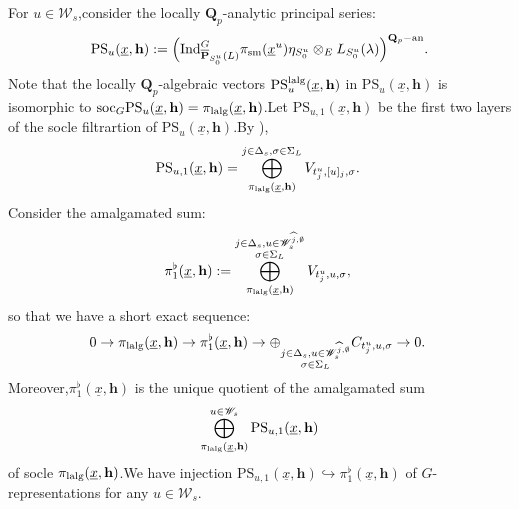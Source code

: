 \documentclass[10pt]{article}
\newcommand{\ind}{{\rm Ind}}
\newcommand{\ana}{{\rm an}}
\newcommand{\op}{{\overline{{\mathbf{P}}}}}
\newcommand{\soc}{{\rm soc}}
\newcommand{\sm}{{\rm sm}}
\newcommand{\lalg}{{\rm lalg}}
\newcommand{\bQ}{{\mathbf{Q}}}
\newcommand{\bh}{{\mathbf{h}}}
\newcommand{\sW}{\mathscr W}
\begin{document}
For $u\in\sW_s$,\;consider the locally  $\bQ_p$-analytic  principal series:
\begin{equation}\label{locaparabolicind}
	\begin{aligned}
	&\mathrm{PS}_{u}(\underline{x},\bh):=\Big(\ind^G_{\op_{S^u_0}(L)}\pi_{\sm}(\underline{x}^u)\eta_{S^u_0}\otimes_E L_{S_0^u}(\lambda)\Big)^{\bQ_p-\ana}.\\
	\end{aligned}
\end{equation}
Note that the locally $\bQ_p$-algebraic vectors  $\mathrm{PS}^{\lalg}_{u}(\underline{x},\bh)$ in $\mathrm{PS}_{u}(\underline{x},\bh)$ is isomorphic to  $\soc_G\mathrm{PS}_{u}(\underline{x},\bh)=\pi_{\lalg}(\underline{x},\bh)$.\;Let $\mathrm{PS}_{u,1}(\underline{x},\bh)$ be the first two layers of the socle filtrartion of $\mathrm{PS}_{u}(\underline{x},\bh)$.\;By \cite[The main theorem]{orlik2015jordan}),\;
\[\mathrm{PS}_{u,1}(\underline{x},\bh)=\bigoplus_{\pi_{\lalg}(\underline{x},\bh)}^{{j\in \Delta_s,\sigma\in \Sigma_L}}V_{t^u_j,[u]_j,\sigma}.\;\]
Consider the amalgamated sum:
\[\pi^{\flat}_{1}(\underline{x},\bh):=\bigoplus_{\pi_{\lalg}(\underline{x},\bh)}^{\substack{j\in \Delta_s,u\in\sW_{s}^{\widehat{j},\emptyset}\\\sigma\in \Sigma_L}}V_{t^u_j,u,\sigma},\;\]
so that we have a short exact sequence:
\begin{equation}\label{firstwhole}
	0\rightarrow \pi_{\lalg}(\underline{x},\bh) \rightarrow \pi^{\flat}_{1}(\underline{x},\bh)\rightarrow \oplus_{\substack{j\in \Delta_s,u\in\sW_{s}^{\widehat{j},\emptyset}\\\sigma\in \Sigma_L}}C_{t^u_j,u,\sigma}\rightarrow 0.\;
\end{equation}
Moreover,\;$\pi^{\flat}_{1}(\underline{x},\bh)$ is the unique quotient of the amalgamated sum 
\[\bigoplus^{u\in \sW_{s}}_{\pi_{\lalg}(\underline{x},\bh)}\mathrm{PS}_{u,1}(\underline{x},\bh)\]
of socle $\pi_{\lalg}(\underline{x},\bh)$.\;We have injection $\mathrm{PS}_{u,1}(\underline{x},\bh)\hookrightarrow \pi^{\flat}_{1}(\underline{x},\bh)$ of $G$-representations for any $u\in \sW_{s}$.\;
\end{document}

